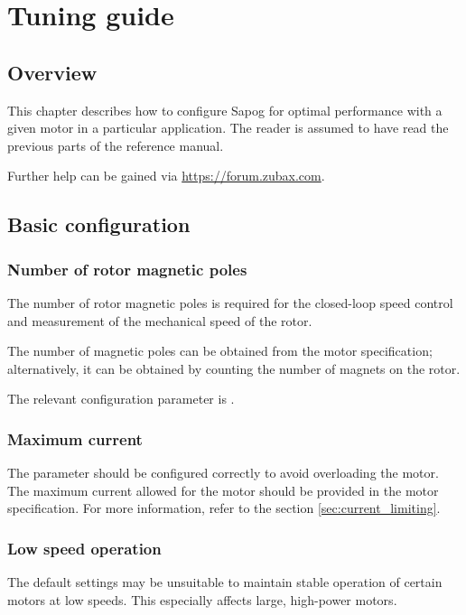 \documentclass{zubaxdoc}
\begin{document}
\chapter{Tuning guide}

\section{Overview}

This chapter describes how to configure Sapog for optimal performance with a given motor
in a particular application.
The reader is assumed to have read the previous parts of the reference manual.

Further help can be gained via \url{https://forum.zubax.com}.

\section{Basic configuration}

\subsection{Number of rotor magnetic poles}

The number of rotor magnetic poles is required for the closed-loop speed control and
measurement of the mechanical speed of the rotor.

The number of magnetic poles can be obtained from the motor specification;
alternatively, it can be obtained by counting the number of magnets on the rotor.

The relevant configuration parameter is .

\subsection{Maximum current}

The parameter  should be configured correctly to avoid overloading the motor.
The maximum current allowed for the motor should be provided in the motor specification.
For more information, refer to the section \ref{sec:current_limiting}.

\subsection{Low speed operation}

The default settings may be unsuitable to maintain stable operation of certain motors at low speeds.
This especially affects large, high-power motors.
\end{document}
